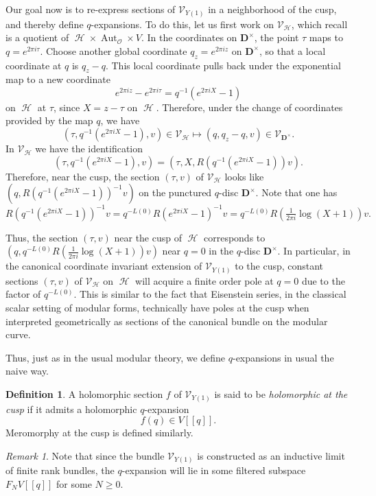 \documentclass[12pt]{amsart}
\theoremstyle{plain}
\theoremstyle{definition}
\newtheorem{dfn}[thm]{Definition}
\theoremstyle{remark}
\newtheorem{rmk}[thm]{Remark}
\newcommand{\cO}{\mathcal{O}}
\newcommand{\cV}{\mathcal{V}}
\newcommand{\bD}{\mathbf{D}}
\DeclareMathOperator{\uhp}{\mathcal{H}}
\DeclareMathOperator{\Aut}{Aut}
\providecommand{\pseries}[2]{#1[\![ #2 ]\!]}
\begin{document}
\medskip
Our goal now is to re-express sections of $\cV_{Y(1)}$ in a neighborhood of the cusp, and thereby define $q$-expansions. To do this, let us first work on $\cV_{\uhp}$, which recall is a quotient of $\uhp \times \Aut_{\cO} \times V$. In the coordinates on $\bD^\times$, the point $\tau$ maps to $q=e^{2\pi i \tau}$. Choose another global coordinate $q_z = e^{2\pi i z}$ on $\bD^\times$, so that a local coordinate at $q$ is $q_z -q$. This local coordinate pulls back under the exponential map to a new coordinate
\[
e^{2\pi iz}-e^{2\pi i \tau} = q^{-1}(e^{2\pi iX}-1)
\]
on $\uhp$ at $\tau$, since $X = z-\tau$ on $\uhp$. Therefore, under the change of coordinates provided by the map $q$, we have
\[
(\tau,q^{-1}(e^{2\pi i X}-1),v) \in \cV_{\uhp} \mapsto (q,q_z-q,v) \in \cV_{\bD^\times}.
\]
In $\cV_{\uhp}$ we have the identification
\[
(\tau,q^{-1}(e^{2\pi i X}-1),v) = (\tau,X,R(q^{-1}(e^{2\pi i X}-1))v).
\]
Therefore, near the cusp, the section $(\tau,v)$ of $\cV_{\uhp}$ looks like $(q,R(q^{-1}(e^{2\pi i X}-1))^{-1}v)$ on the punctured $q$-disc $\bD^\times$. Note that one has
\[
R(q^{-1}(e^{2\pi i X}-1))^{-1}v = q^{-L(0)}R(e^{2\pi i X}-1)^{-1}v= q^{-L(0)}R\left(\tfrac 1{2\pi i}\log(X+1)\right)v.
\]

\medskip
Thus, the section $(\tau,v)$ near the cusp of $\uhp$ corresponds to $(q,q^{-L(0)}R(\tfrac 1{2\pi i}\log(X+1))v)$ near $q=0$ in the $q$-disc $\bD^\times$. In particular, in the canonical coordinate invariant extension of $\cV_{Y(1)}$ to the cusp, constant sections $(\tau,v)$ of $\cV_{\uhp}$ on $\uhp$ will acquire a finite order pole at $q=0$ due to the factor of $q^{-L(0)}$. This is similar to the fact that Eisenstein series, in the classical scalar setting of modular forms, technically have poles at the cusp when interpreted geometrically as sections of the canonical bundle on the modular curve.

Thus, just as in the usual modular theory, we define $q$-expansions in usual the naive way. 
\begin{dfn}
\label{d:holomorphicatcusp}
    A holomorphic section $f$ of $\cV_{Y(1)}$ is said to be \emph{holomorphic at the cusp} if it admits a holomorphic $q$-expansion
    \[
      f(q) \in \pseries{V}{q}.
    \]
    Meromorphy at the cusp is defined similarly.
\end{dfn}
\begin{rmk}
Note that since the bundle $\cV_{Y(1)}$ is constructed as an inductive limit of finite rank bundles, the $q$-expansion will lie in some filtered subspace $\pseries{F_NV}{q}$ for some $N\geq 0$.    
\end{rmk}
\end{document}
